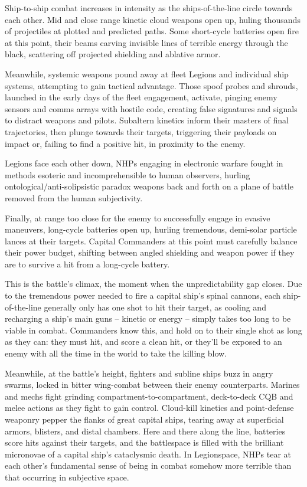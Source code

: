 Ship-to-ship combat increases in intensity as the ships-of-the-line circle towards each other. Mid
and close range kinetic cloud weapons open up, huling thousands of projectiles at plotted and
predicted paths. Some short-cycle batteries open fire at this point, their beams carving invisible
lines of terrible energy through the black, scattering off projected shielding and ablative armor.


Meanwhile, systemic weapons pound away at fleet Legions and individual ship systems,
attempting to gain tactical advantage. Those spoof probes and shrouds, launched in the early
days of the fleet engagement, activate, pinging enemy sensors and comms arrays with hostile
code, creating false signatures and signals to distract weapons and pilots. Subaltern kinetics
inform their masters of final trajectories, then plunge towards their targets, triggering their
payloads on impact or, failing to find a positive hit, in proximity to the enemy.


Legions face each other down, NHPs engaging in electronic warfare fought in methods esoteric
and incomprehensible to human observers, hurling ontological/anti-solipsistic paradox weapons
back and forth on a plane of battle removed from the human subjectivity.


Finally, at range too close for the enemy to successfully engage in evasive maneuvers, long-cycle
batteries open up, hurling tremendous, demi-solar particle lances at their targets. Capital
Commanders at this point must carefully balance their power budget, shifting between angled
shielding and weapon power if they are to survive a hit from a long-cycle battery.


This is the battle’s climax, the moment when the unpredictability gap closes. Due to the
tremendous power needed to fire a capital ship’s spinal cannons, each ship-of-the-line generally
only has one shot to hit their target, as cooling and recharging a ship’s main guns -- kinetic or
energy -- simply takes too long to be viable in combat. Commanders know this, and hold on to
their single shot as long as they can: they must hit, and score a clean hit, or they’ll be exposed to
an enemy with all the time in the world to take the killing blow.


Meanwhile, at the battle’s height, fighters and subline ships buzz in angry swarms, locked in
bitter wing-combat between their enemy counterparts. Marines and mechs fight grinding
compartment-to-compartment, deck-to-deck CQB and melee actions as they fight to gain
control. Cloud-kill kinetics and point-defense weaponry pepper the flanks of great capital ships,
tearing away at superficial armors, blisters, and distal chambers. Here and there along the line,
batteries score hits against their targets, and the battlespace is filled with the brilliant micronovae
of a capital ship’s cataclysmic death. In Legionspace, NHPs tear at each other’s fundamental
sense of being in combat somehow more terrible than that occurring in subjective space.


